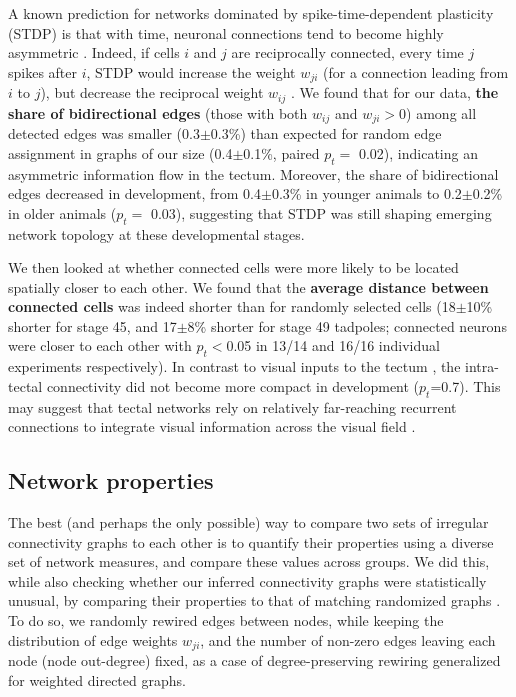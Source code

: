 \documentclass{article}
\begin{document}
A known prediction for networks dominated by spike-time-dependent plasticity (STDP) is that with time, neuronal connections tend to become highly asymmetric \citep{pratt2008recurrent, richards2010stdp}. Indeed, if cells $i$ and $j$ are reciprocally connected, every time $j$ spikes after $i$, STDP would increase the weight $w_{ji}$ (for a connection leading from $i$ to $j$), but decrease the reciprocal weight $w_{ij}$ \citep{abbott1996ltpsequence, fiete2010chains}. We found that for our data, \textbf{the share of bidirectional edges} (those with both $w_{ij}$ and $w_{ji}>$0) among all detected edges was smaller (0.3$\pm$0.3\%) than expected for random edge assignment in graphs of our size (0.4$\pm$0.1\%, paired $p_t=$ 0.02), indicating an asymmetric information flow in the tectum. Moreover, the share of bidirectional edges decreased in development, from 0.4$\pm$0.3\% in younger animals to 0.2$\pm$0.2\% in older animals ($p_t=$ 0.03), suggesting that STDP was still shaping emerging network topology at these developmental stages.

We then looked at whether connected cells were more likely to be located spatially closer to each other. We found that the \textbf{average distance between connected cells} was indeed shorter than for randomly selected cells (18$\pm$10\% shorter for stage 45, and 17$\pm$8\% shorter for stage 49 tadpoles; connected neurons were closer to each other with $p_t<$0.05 in 13/14 and 16/16 individual experiments respectively). In contrast to visual inputs to the tectum \citep{tao2005refinement}, the intra-tectal connectivity did not become more compact in development ($p_t$=0.7). This may suggest that tectal networks rely on relatively far-reaching recurrent connections to integrate visual information across the visual field \citep{baginskas2009recurrent, liu2016jumbo, jang2016}.

\subsection*{Network properties}

The best (and perhaps the only possible) way to compare two sets of irregular connectivity graphs to each other is to quantify their properties using a diverse set of network measures, and compare these values across groups. We did this, while also checking whether our inferred connectivity graphs were statistically unusual, by comparing their properties to that of matching randomized graphs \citep{ansmann2012surrogate}. To do so, we randomly rewired edges between nodes, while keeping the distribution of edge weights $w_{ji}$, and the number of non-zero edges leaving each node (node out-degree) fixed, as a case of degree-preserving rewiring \citep{maslov2002} generalized for weighted directed graphs. 
\end{document}
